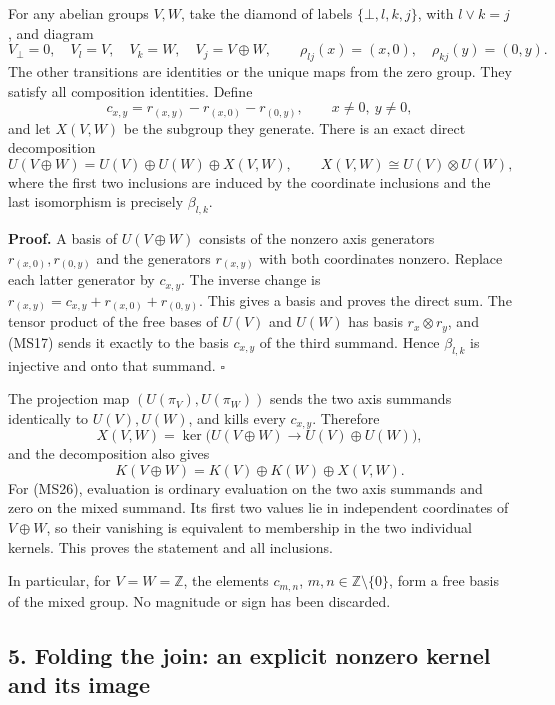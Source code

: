 \documentclass[
]{article}
\begin{document}
For any abelian groups \(V,W\), take the diamond of labels
\(\{\bot,l,k,j\}\), with \(l\vee k=j\), and diagram \[
V_\bot=0,\quad V_l=V,\quad V_k=W,\quad V_j=V\oplus W,
\qquad \rho_{lj}(x)=(x,0),\quad \rho_{kj}(y)=(0,y).
\tag{MS22}
\] The other transitions are identities or the unique maps from the zero
group. They satisfy all composition identities. Define \[
c_{x,y}=r_{(x,y)}-r_{(x,0)}-r_{(0,y)},
\qquad x\ne0,\ y\ne0,
\tag{MS23}
\] and let \(X(V,W)\) be the subgroup they generate. There is an exact
direct decomposition \[
U(V\oplus W)=U(V)\oplus U(W)\oplus X(V,W),
\qquad X(V,W)\cong U(V)\otimes U(W),
\tag{MS24}
\] where the first two inclusions are induced by the coordinate
inclusions and the last isomorphism is precisely \(\beta_{l,k}\).

\textbf{Proof.} A basis of \(U(V\oplus W)\) consists of the nonzero axis
generators \(r_{(x,0)},r_{(0,y)}\) and the generators \(r_{(x,y)}\) with
both coordinates nonzero. Replace each latter generator by \(c_{x,y}\).
The inverse change is \(r_{(x,y)}=c_{x,y}+r_{(x,0)}+r_{(0,y)}\). This
gives a basis and proves the direct sum. The tensor product of the free
bases of \(U(V)\) and \(U(W)\) has basis \(r_x\otimes r_y\), and (MS17)
sends it exactly to the basis \(c_{x,y}\) of the third summand. Hence
\(\beta_{l,k}\) is injective and onto that summand. \(\square\)

The projection map \((U(\pi_V),U(\pi_W))\) sends the two axis summands
identically to \(U(V),U(W)\), and kills every \(c_{x,y}\). Therefore \[
X(V,W)=\ker\bigl(U(V\oplus W)\longrightarrow U(V)\oplus U(W)\bigr),
\tag{MS25}
\] and the decomposition also gives \[
K(V\oplus W)=K(V)\oplus K(W)\oplus X(V,W).
\tag{MS26}
\] For (MS26), evaluation is ordinary evaluation on the two axis
summands and zero on the mixed summand. Its first two values lie in
independent coordinates of \(V\oplus W\), so their vanishing is
equivalent to membership in the two individual kernels. This proves the
statement and all inclusions.

In particular, for \(V=W=\mathbb Z\), the elements \(c_{m,n}\),
\(m,n\in\mathbb Z\setminus\{0\}\), form a free basis of the mixed group.
No magnitude or sign has been discarded.

\subsection{5. Folding the join: an explicit nonzero kernel and its
image}\label{folding-the-join-an-explicit-nonzero-kernel-and-its-image}
\end{document}
